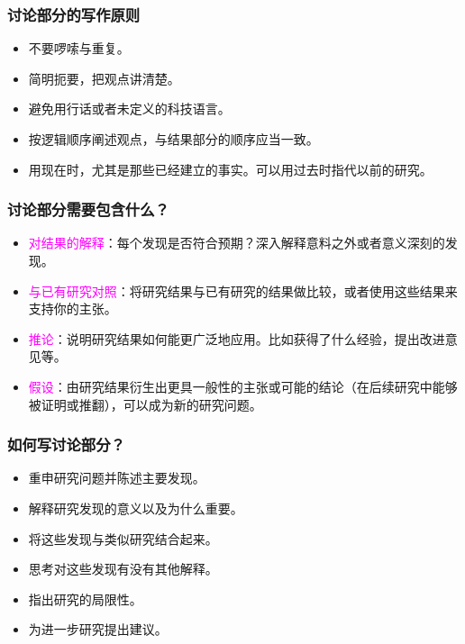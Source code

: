\documentclass[cn,hazy,blue,14pt,screen]{elegantnote} %
\begin{document}
\subsubsection{讨论部分的写作原则}

\begin{itemize}
  \item 不要啰嗦与重复。
  \item 简明扼要，把观点讲清楚。
  \item 避免用行话或者未定义的科技语言。
  \item 按逻辑顺序阐述观点，与结果部分的顺序应当一致。
  \item 用现在时，尤其是那些已经建立的事实。可以用过去时指代以前的研究。
\end{itemize}

\subsubsection{讨论部分需要包含什么？}

\begin{itemize}
  \item \textcolor{magenta}{对结果的解释}：每个发现是否符合预期？深入解释意料之外或者意义深刻的发现。
  \item \textcolor{magenta}{与已有研究对照}：将研究结果与已有研究的结果做比较，或者使用这些结果来支持你的主张。
  \item \textcolor{magenta}{推论}：说明研究结果如何能更广泛地应用。比如获得了什么经验，提出改进意见等。
  \item \textcolor{magenta}{假设}：由研究结果衍生出更具一般性的主张或可能的结论（在后续研究中能够被证明或推翻），可以成为新的研究问题。
\end{itemize}

\subsubsection{如何写讨论部分？}

\begin{itemize}
  \item 重申研究问题并陈述主要发现。
  \item 解释研究发现的意义以及为什么重要。
  \item 将这些发现与类似研究结合起来。
  \item 思考对这些发现有没有其他解释。
  \item 指出研究的局限性。
  \item 为进一步研究提出建议。
\end{itemize}
\end{document}
